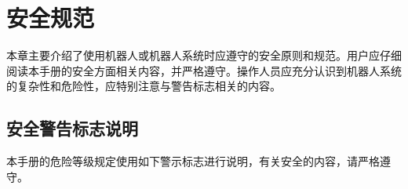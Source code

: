 \documentclass[a4paper,11pt,english,openany,oneside]{sphinxmanual}
\begin{document}
\sphinxstepscope


\chapter{安全规范}
\label{\detokenize{_u5b89_u5168_u89c4_u8303:id1}}\label{\detokenize{_u5b89_u5168_u89c4_u8303:id2}}\label{\detokenize{_u5b89_u5168_u89c4_u8303::doc}}
\sphinxAtStartPar
本章主要介绍了使用机器人或机器人系统时应遵守的安全原则和规范。用户应仔细阅读本手册的安全方面相关内容，并严格遵守。操作人员应充分认识到机器人系统的复杂性和危险性，应特别注意与警告标志相关的内容。


\section{安全警告标志说明}
\label{\detokenize{_u5b89_u5168_u89c4_u8303:id3}}
\sphinxAtStartPar
本手册的危险等级规定使用如下警示标志进行说明，有关安全的内容，请严格遵守。
\end{document}
